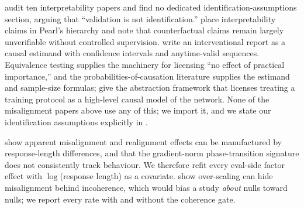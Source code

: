  \citet{position2026identification} audit ten interpretability papers and find no dedicated identification-assumptions section, arguing that ``validation is not identification.'' \citet{causalitykey2026} place interpretability claims in Pearl's hierarchy and note that counterfactual claims remain largely unverifiable without controlled supervision. \citet{cif2026} write an interventional report as a causal estimand with confidence intervals and anytime-valid sequences. Equivalence testing \citep{wellek2005} supplies the machinery for licensing ``no effect of practical importance,'' and the probabilities-of-causation literature \citep{pnps2022,mediation2026} supplies the estimand and sample-size formulas; \citet{geiger2021abstraction} give the abstraction framework that licenses treating a training protocol as a high-level causal model of the network. None of the misalignment papers above use any of this; we import it, and we state our identification assumptions explicitly in .

 \citet{mirage2026} show apparent misalignment and realignment effects can be manufactured by response-length differences, and that the gradient-norm phase-transition signature does not consistently track behaviour. We therefore refit every eval-side factor effect with $\log$(response length) as a covariate. \citet{turner2025organisms} show over-scaling can hide misalignment behind incoherence, which would bias a study \emph{about} nulls toward nulls; we report every rate with and without the coherence gate.
